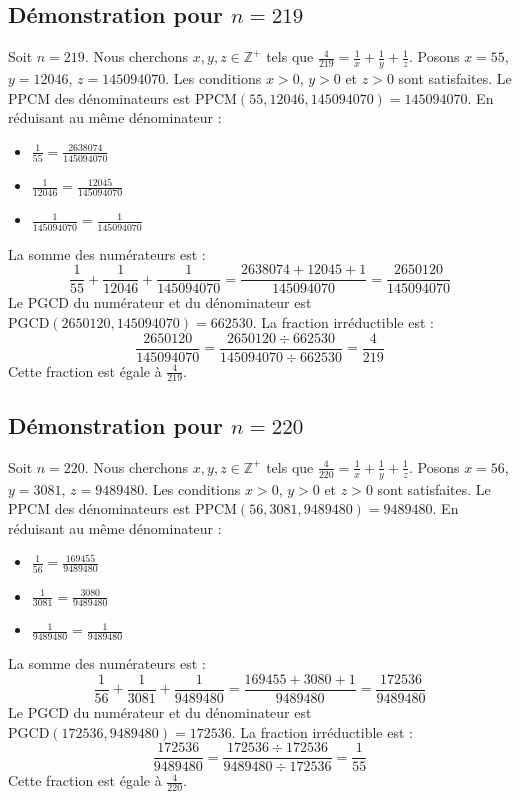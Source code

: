 \documentclass[11pt,a4paper]{article}
\begin{document}
\subsection{Démonstration pour $n = 219$}
Soit $n = 219$. Nous cherchons $x, y, z \in \mathbb{Z}^{+}$ tels que $\frac{4}{219} = \frac{1}{x} + \frac{1}{y} + \frac{1}{z}$.
Posons $x = 55$, $y = 12046$, $z = 145094070$.
Les conditions $x > 0$, $y > 0$ et $z > 0$ sont satisfaites.
Le PPCM des dénominateurs est $\text{PPCM}(55, 12046, 145094070) = 145094070$.
En réduisant au même dénominateur :
\begin{itemize}
    \item $\frac{1}{55} = \frac{2638074}{145094070}$
    \item $\frac{1}{12046} = \frac{12045}{145094070}$
    \item $\frac{1}{145094070} = \frac{1}{145094070}$
\end{itemize}
La somme des numérateurs est :
$$ \frac{1}{55} + \frac{1}{12046} + \frac{1}{145094070} = \frac{2638074 + 12045 + 1}{145094070} = \frac{2650120}{145094070} $$
Le PGCD du numérateur et du dénominateur est $\text{PGCD}(2650120, 145094070) = 662530$.
La fraction irréductible est :
$$ \frac{2650120}{145094070} = \frac{2650120 \div 662530}{145094070 \div 662530} = \frac{4}{219} $$
Cette fraction est égale à $\frac{4}{219}$.

\subsection{Démonstration pour $n = 220$}
Soit $n = 220$. Nous cherchons $x, y, z \in \mathbb{Z}^{+}$ tels que $\frac{4}{220} = \frac{1}{x} + \frac{1}{y} + \frac{1}{z}$.
Posons $x = 56$, $y = 3081$, $z = 9489480$.
Les conditions $x > 0$, $y > 0$ et $z > 0$ sont satisfaites.
Le PPCM des dénominateurs est $\text{PPCM}(56, 3081, 9489480) = 9489480$.
En réduisant au même dénominateur :
\begin{itemize}
    \item $\frac{1}{56} = \frac{169455}{9489480}$
    \item $\frac{1}{3081} = \frac{3080}{9489480}$
    \item $\frac{1}{9489480} = \frac{1}{9489480}$
\end{itemize}
La somme des numérateurs est :
$$ \frac{1}{56} + \frac{1}{3081} + \frac{1}{9489480} = \frac{169455 + 3080 + 1}{9489480} = \frac{172536}{9489480} $$
Le PGCD du numérateur et du dénominateur est $\text{PGCD}(172536, 9489480) = 172536$.
La fraction irréductible est :
$$ \frac{172536}{9489480} = \frac{172536 \div 172536}{9489480 \div 172536} = \frac{1}{55} $$
Cette fraction est égale à $\frac{4}{220}$.
\end{document}
